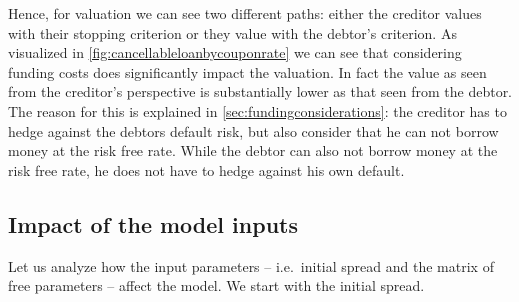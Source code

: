 \documentclass[12pt]{article}
\begin{document}
	Hence, for valuation we can see two different paths: either the creditor values with their stopping criterion or they value with the debtor's criterion. 
	As visualized in \cref{fig:cancellableloanbycouponrate} we can see that considering funding costs does significantly impact the valuation. In fact the value as seen from the creditor's perspective is substantially lower as that seen from the debtor. The reason for this is explained in \cref{sec:fundingconsiderations}: the creditor has to hedge against the debtors default risk, but also consider that he can not borrow money at the risk free rate. While the debtor can also not borrow money at the risk free rate, he does not have to hedge against his own default.
	
	\subsection{Impact of the model inputs}
	Let us analyze how the input parameters -- i.e.\ initial spread and the matrix of free parameters -- affect the model. We start with the initial spread.
\end{document}
